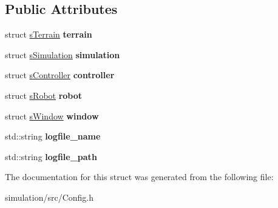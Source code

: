 \subsection*{Public Attributes}
\begin{DoxyCompactItemize}
\item 
\mbox{\label{structconfig_1_1s_config_aca277421f902bb9f2c25b9428a9957b3}} 
struct \mbox{\hyperlink{structconfig_1_1s_terrain}{s\+Terrain}} {\bfseries terrain}
\item 
\mbox{\label{structconfig_1_1s_config_a057b9b1fa05fb7b024ff6c20ab93e5e2}} 
struct \mbox{\hyperlink{structconfig_1_1s_simulation}{s\+Simulation}} {\bfseries simulation}
\item 
\mbox{\label{structconfig_1_1s_config_af6a5e9f0eb966ad92a2fd7428d5ee17e}} 
struct \mbox{\hyperlink{structconfig_1_1s_controller}{s\+Controller}} {\bfseries controller}
\item 
\mbox{\label{structconfig_1_1s_config_aa02aeb8d778bbe36900505ea0b844404}} 
struct \mbox{\hyperlink{structconfig_1_1s_robot}{s\+Robot}} {\bfseries robot}
\item 
\mbox{\label{structconfig_1_1s_config_a397d5923dd1cb6a1cf49df3d62872a98}} 
struct \mbox{\hyperlink{structconfig_1_1s_window}{s\+Window}} {\bfseries window}
\item 
\mbox{\label{structconfig_1_1s_config_a92296b4802c10df4be246afb182b34ba}} 
std\+::string {\bfseries logfile\+\_\+name}
\item 
\mbox{\label{structconfig_1_1s_config_a140ad96bb800b9a2316e1c726a033c36}} 
std\+::string {\bfseries logfile\+\_\+path}
\end{DoxyCompactItemize}


The documentation for this struct was generated from the following file\+:\begin{DoxyCompactItemize}
\item 
simulation/src/Config.\+h\end{DoxyCompactItemize}
